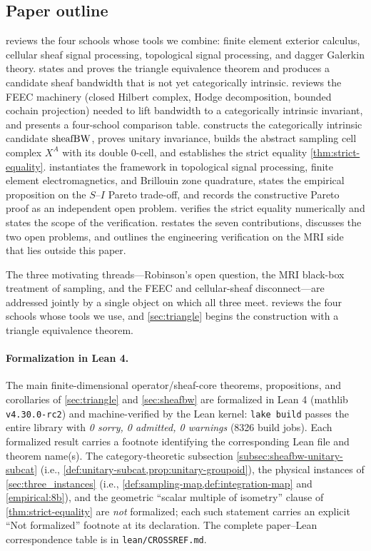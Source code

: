 \subsection{Paper outline}\label{subsec:intro-outline}

 reviews the four schools whose tools we combine:
finite element exterior calculus, cellular sheaf signal processing,
topological signal processing, and dagger Galerkin theory.
 states and proves the triangle equivalence theorem
and produces a candidate sheaf bandwidth that is not yet categorically
intrinsic.  reviews the FEEC machinery
(closed Hilbert complex, Hodge decomposition, bounded cochain
projection) needed to lift bandwidth to a categorically intrinsic
invariant, and presents a four-school comparison table.
 constructs the categorically intrinsic candidate
$\operatorname{sheafBW}$, proves unitary invariance, builds the abstract sampling
cell complex $X^A$ with its double $0$-cell, and establishes the
strict equality \cref{thm:strict-equality}.
 instantiates the framework in topological
signal processing, finite element electromagnetics, and Brillouin
zone quadrature, states the empirical proposition on the
$S$--$I$ Pareto trade-off, and records the constructive Pareto
proof as an independent open problem.  verifies
the strict equality numerically and states the scope of the
verification.  restates the seven contributions,
discusses the two open problems, and outlines the engineering
verification on the MRI side that lies outside this paper.

\medskip\noindent
The three motivating threads---Robinson's open question, the MRI
black-box treatment of sampling, and the FEEC and cellular-sheaf
disconnect---are addressed jointly by a single object on which all
three meet.  reviews the four schools whose
tools we use, and \cref{sec:triangle} begins the construction with a
triangle equivalence theorem.

\paragraph{Formalization in Lean 4.}
The main finite-dimensional operator/sheaf-core theorems, propositions,
and corollaries of \cref{sec:triangle} and \cref{sec:sheafbw} are
formalized in Lean 4 (mathlib \texttt{v4.30.0-rc2}) and machine-verified
by the Lean kernel: \texttt{lake build} passes the entire library with
\emph{0 sorry, 0 admitted, 0 warnings} (8326 build jobs). Each formalized
result carries a footnote identifying the corresponding Lean file and
theorem name(s). The category-theoretic subsection
\cref{subsec:sheafbw-unitary-subcat} (i.e.,
\cref{def:unitary-subcat,prop:unitary-groupoid}), the physical instances
of \cref{sec:three_instances} (i.e.,
\cref{def:sampling-map,def:integration-map} and \cref{empirical:8b}), and
the geometric ``scalar multiple of isometry'' clause of
\cref{thm:strict-equality} are \emph{not} formalized; each such statement
carries an explicit ``Not formalized'' footnote at its declaration. The
complete paper--Lean correspondence table is in \texttt{lean/CROSSREF.md}.
